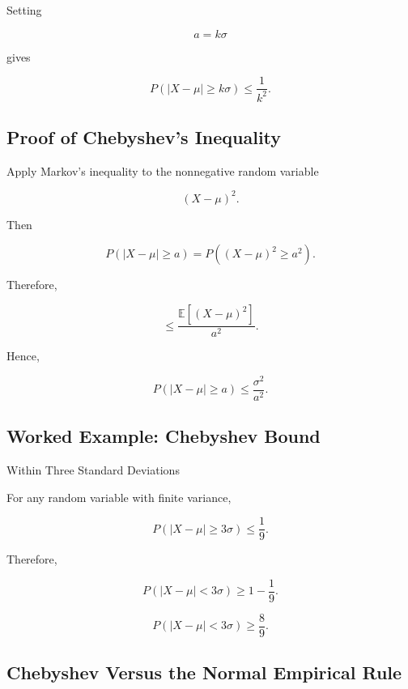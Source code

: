 Setting

\[
a=k\sigma
\]

gives

\[
\boxed{
P(|X-\mu|\geq k\sigma)
\leq
\frac1{k^2}.
}
\]

\subsection{Proof of Chebyshev's Inequality}
\label{subsec:proof-chebyshev}

Apply Markov's inequality to the nonnegative random variable

\[
(X-\mu)^2.
\]

Then

\[
P(|X-\mu|\geq a)
=
P((X-\mu)^2\geq a^2).
\]

Therefore,

\[
\leq
\frac{
\mathbb{E}[(X-\mu)^2]
}{
a^2
}.
\]

Hence,

\[
\boxed{
P(|X-\mu|\geq a)
\leq
\frac{\sigma^2}{a^2}.
}
\]

\subsection{Worked Example: Chebyshev Bound}
\label{subsec:worked-chebyshev}

\begin{workedexamplebox}{Within Three Standard Deviations}

For any random variable with finite variance,

\[
P(|X-\mu|\geq3\sigma)
\leq
\frac19.
\]

Therefore,

\[
P(|X-\mu|<3\sigma)
\geq
1-\frac19.
\]

\begin{answerbox}
\[
\boxed{
P(|X-\mu|<3\sigma)
\geq
\frac89.
}
\]
\end{answerbox}

\end{workedexamplebox}

\subsection{Chebyshev Versus the Normal Empirical Rule}
\label{subsec:chebyshev-normal-comparison}

